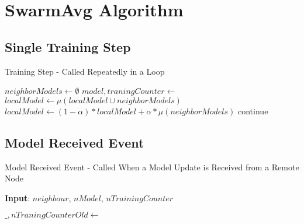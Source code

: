 \appendix

\chapter{SwarmAvg Algorithm} \label{slalgo}
\section{Single Training Step} \label{slalgo:ul}
\begin{algorithm}[H]
	\caption{Training Step - Called Repeatedly in a Loop}
	\begin{algorithmic}[1]
		\State {}
		\State {}
		\EndFor
		
		\State $neighborModels \gets \emptyset$
		\State $model, traningCounter \gets$ 
		\State {}
		\EndIf
		\EndFor
		\State $localModel \gets \mu(localModel \cup neighborModels)$
		\State $localModel \gets (1 - \alpha) * localModel + \alpha * \mu(neighborModels)$
		\EndIf
		\Else
		\State continue
		\EndIf
		\State {}
		\EndFor
	\end{algorithmic}
\end{algorithm}

\section{Model Received Event} \label{slalgo:mre}
\begin{algorithm}[H]
	\caption{Model Received Event - Called When a Model Update is Received from a Remote Node}
	\textbf{Input}: $neighbour$, $nModel$, $nTrainingCounter$
	\newline
	\begin{algorithmic}[1]
			\State $\_, nTraningCounterOld \gets$ 
				\State {}
			\EndIf
		\Else
			\State {}
		\EndIf
	\end{algorithmic}
\end{algorithm}

